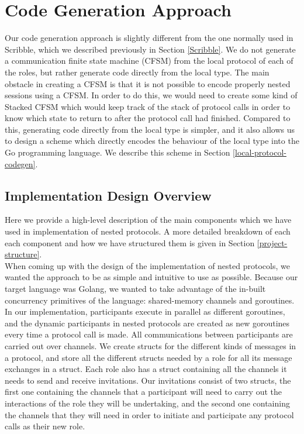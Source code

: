 \documentclass[12pt,twoside]{report}
\begin{document}

\section{Code Generation Approach}\label{codegen-approach}
Our code generation approach is slightly different from the one normally used in Scribble, which we described previously in Section \ref{Scribble}. We do not generate a communication finite state machine (CFSM) from the local protocol of each of the roles, but rather generate code directly from the local type. The main obstacle in creating a CFSM is that it is not possible to encode properly nested sessions using a CFSM. In order to do this, we would need to create some kind of Stacked CFSM which would keep track of the stack of protocol calls in order to know which state to return to after the protocol call had finished. Compared to this, generating code directly from the local type is simpler, and it also allows us to design a scheme which directly encodes the behaviour of the local type into the Go programming language. We describe this scheme in Section \ref{local-protocol-codegen}.

\subsection{Implementation Design Overview}
Here we provide a high-level description of the main components which we have used in implementation of nested protocols. A more detailed breakdown of each each component and how we have structured them is given in Section \ref{project-structure}. \\

When coming up with the design of the implementation of nested protocols, we wanted the approach to be as simple and intuitive to use as possible. Because our target language was Golang, we wanted to take advantage of the in-built concurrency primitives of the language: shared-memory channels and goroutines.\\

In our implementation, participants execute in parallel as different goroutines, and the dynamic participants in nested protocols are created as new goroutines every time a protocol call is made. All communications between participants are carried out over channels. We create structs for the different kinds of messages in a protocol, and store all the different structs needed by a role for all its message exchanges in a struct. Each role also has a struct containing all the channels it needs to send and receive invitations. Our invitations consist of two structs, the first one containing the channels that a participant will need to carry out the interactions of the role they will be undertaking, and the second one containing the channels that they will need in order to initiate and participate any protocol calls as their new role. \\
\end{document}
